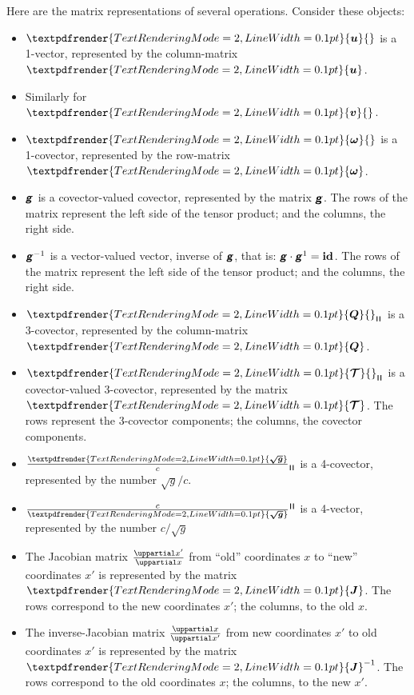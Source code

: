 \documentclass[\ifafour a4paper,12pt,\else a5paper,10pt,\fi%
onecolumn,oneside,article,%
british%
]{memoir}
\makeatletter
\theoremstyle{remark}
\theoremstyle{innote}
\newcommand*{\mathte}[1]{\textbf{\textit{\textsf{#1}}}}
\renewcommand*{\bm}[1]{\textpdfrender{TextRenderingMode=2,LineWidth=0.1pt}{\boldsymbol{#1}}}
\newcommand*{\de}{\uppartial}%
\renewcommand*{\|}[1][]{\nonscript\:#1\vert\nonscript\:\mathopen{}}
\newcommand*{\id}{\mathbf{id}}%
\renewcommand*{\i}{{}\indices}
\newcommand*{\q}{}%
\DeclareRobustCommand*{\q}{%
  \mathord{\mathpalette\bigcdot@{}}%
}
\newcommand*{\bigcdot@scalefactor}{0.7}
\newcommand*{\bigcdot@widthfactor}{1.5}
\newcommand*{\bigcdot@}[2]{%
  \sbox0{$#1\vcenter{}$}%
  \sbox2{$#1\cdot\m@th$}%
  \hbox to \bigcdot@widthfactor\wd2{%
    \hfil
    \raise\ht0\hbox{%
      \scalebox{\bigcdot@scalefactor}{%
        \lower\ht0\hbox{$#1\bullet\m@th$}%
      }%
    }%
    \hfil
  }%
}
\newcommand*{\rul}{{\mkern2mu\rule[-0.1ex]{0.75pt}{1.1ex}\mkern2mu}}
\DeclarePairedDelimiter\mul{\rul}{\rul}%
\newcommand*{\yg}{\mathte{g}}
\newcommand*{\dg}{\sqrt{g}}
\newcommand*{\ve}{\tfrac{\bm{\sqrt{g}}}{c}}
\newcommand*{\vi}{\tfrac{c}{\bm{\sqrt{g}}}}
\newcommand*{\yQ}{\bm{Q}}
\newcommand*{\yTT}{\bm{\mathcal{T}}}
\newcommand*{\yu}{\bm{u}}
\newcommand*{\yv}{\bm{v}}
\newcommand*{\yo}{\bm{\omega}}
\newcommand*{\yJ}{\bm{J}}
\makeatother
\begin{document}
Here are the matrix representations of several operations. Consider these objects:
\begin{itemize}
\item $\yu\i{^{\q}}$ is a 1-vector, represented by the column-matrix $\yu$.
\item Similarly for $\yv\i{^{\q}}$.
\item $\yo\i{_{\q}}$ is a 1-covector, represented by the row-matrix $\yo$.
\item $\yg\i{_{\q\q}}$ is a covector-valued covector, represented by the matrix $\yg$. The rows of the matrix represent the left side of the tensor product; and the columns, the right side.
\item ${\yg^{-1}}\i{^{\q\q}}$ is a vector-valued vector, inverse of $\yg$, that is: $\yg\cdot\yg^{1} = \id\i{_{\q}^{\q}}$. The rows of the matrix represent the left side of the tensor product; and the columns, the right side.

\item $\yQ\i{_{\mul{\q\q\q}}}$ is a 3-covector, represented by the column-matrix $\yQ$.

\item $\yTT\i{_{\mul{\q\q\q}\q}}$ is a covector-valued 3-covector, represented by the matrix $\yTT$. The rows represent the 3-covector components; the columns, the covector components.
\item $\ve\i{_{\mul{\q\q\q\q}}}$ is a 4-covector, represented by the number $\dg/c$.
\item ${\vi}\i{^{\mul{\q\q\q\q}}}$ is a 4-vector, represented by the number $c/\dg$
\item The Jacobian matrix $\frac{\de x'}{\de x}$ from \enquote{old} coordinates $x$ to \enquote{new} coordinates $x'$ is represented by the matrix $\yJ$. The rows correspond to the new coordinates $x'$; the columns, to the old $x$.

\item The inverse-Jacobian matrix $\frac{\de x}{\de x'}$ from new coordinates $x'$ to old coordinates $x'$ is represented by the matrix $\yJ^{-1}$. The rows correspond to the old coordinates $x$; the columns, to the new $x'$.
\end{itemize}
\end{document}
